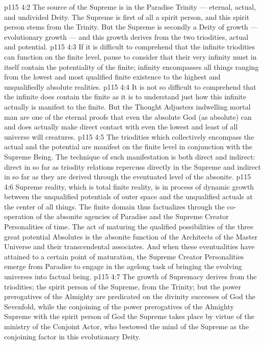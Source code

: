 \vs p115 4:2 The source of the Supreme is in the Paradise Trinity --- eternal, actual, and undivided Deity. The Supreme is first of all a spirit person, and this spirit person stems from the Trinity. But the Supreme is secondly a Deity of growth --- evolutionary growth --- and this growth derives from the two triodities, actual and potential.
\vs p115 4:3 If it is difficult to comprehend that the infinite triodities can function on the finite level, pause to consider that their very infinity must in itself contain the potentiality of the finite; infinity encompasses all things ranging from the lowest and most qualified finite existence to the highest and unqualifiedly absolute realities.
\vs p115 4:4 It is not so difficult to comprehend that the infinite does contain the finite as it is to understand just how this infinite actually is manifest to the finite. But the Thought Adjusters indwelling mortal man are one of the eternal proofs that even the absolute God (as absolute) can and does actually make direct contact with even the lowest and least of all universe will creatures.
\vs p115 4:5 The triodities which collectively encompass the actual and the potential are manifest on the finite level in conjunction with the Supreme Being. The technique of such manifestation is both direct and indirect: direct in so far as triodity relations repercuss directly in the Supreme and indirect in so far as they are derived through the eventuated level of the absonite.
\vs p115 4:6 Supreme reality, which is total finite reality, is in process of dynamic growth between the unqualified potentials of outer space and the unqualified actuals at the center of all things. The finite domain thus factualizes through the co\hyp{}operation of the absonite agencies of Paradise and the Supreme Creator Personalities of time. The act of maturing the qualified possibilities of the three great potential Absolutes is the absonite function of the Architects of the Master Universe and their transcendental associates. And when these eventualities have attained to a certain point of maturation, the Supreme Creator Personalities emerge from Paradise to engage in the agelong task of bringing the evolving universes into factual being.
\vs p115 4:7 The growth of Supremacy derives from the triodities; the spirit person of the Supreme, from the Trinity; but the power prerogatives of the Almighty are predicated on the divinity successes of God the Sevenfold, while the conjoining of the power prerogatives of the Almighty Supreme with the spirit person of God the Supreme takes place by virtue of the ministry of the Conjoint Actor, who bestowed the mind of the Supreme as the conjoining factor in this evolutionary Deity.
